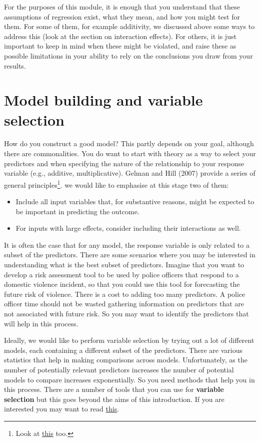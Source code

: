 \documentclass[
]{book}
\begin{document}
For the purposes of this module, it is enough that you understand that these assumptions of regression exist, what they mean, and how you might test for them. For some of them, for example additivity, we discussed above some ways to address this (look at the section on interaction effects). For others, it is just important to keep in mind when these might be violated, and raise these as possible limitations in your ability to rely on the conclusions you draw from your results.

\section{Model building and variable selection}\label{model-building-and-variable-selection}

How do you construct a good model? This partly depends on your goal, although there are commonalities. You do want to start with theory as a way to select your predictors and when specifying the nature of the relationship to your response variable (e.g., additive, multiplicative). Gelman and Hill (2007) provide a series of general principles\footnote{Look at \href{http://www.r-bloggers.com/stop-using-bivariate-correlations-for-variable-selection/}{this} too.}. we would like to emphasise at this stage two of them:

\begin{itemize}
\item
  Include all input variables that, for substantive reasons, might be expected to be important in predicting the outcome.
\item
  For inputs with large effects, consider including their interactions as well.
\end{itemize}

It is often the case that for any model, the response variable is only related to a subset of the predictors. There are some scenarios where you may be interested in understanding what is the best subset of predictors. Imagine that you want to develop a risk assessment tool to be used by police officers that respond to a domestic violence incident, so that you could use this tool for forecasting the future risk of violence. There is a cost to adding too many predictors. A police officer time should not be wasted gathering information on predictors that are not associated with future risk. So you may want to identify the predictors that will help in this process.

Ideally, we would like to perform variable selection by trying out a lot of different models, each containing a different subset of the predictors. There are various statistics that help in making comparisons across models. Unfortunately, as the number of potentially relevant predictors increases the number of potential models to compare increases exponentially. So you need methods that help you in this process. There are a number of tools that you can use for \textbf{variable selection} but this goes beyond the aims of this introduction. If you are interested you may want to read \href{http://link.springer.com/chapter/10.1007/978-1-4614-7138-7_6}{this}.
\end{document}
